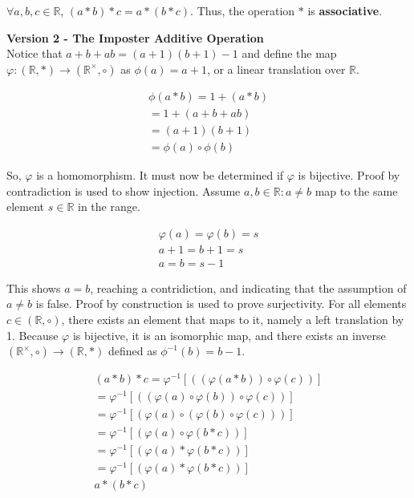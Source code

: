 \documentclass[12pt,letterpaper]{article}
\begin{document}
\begin{enumerate}
   $\forall a, b, c \in \mathbb{R}$, $(a * b) * c = a * (b * c)$.
   Thus, the operation $*$ is \textbf{associative}.

   \textbf{Version 2 - The Imposter Additive Operation} \\
   Notice that $a + b + ab = (a + 1)(b + 1) - 1$ and define the map $\varphi : (\mathbb{R}, *) \to (\mathbb{R}^\times, \circ)$ as 
   $\phi(a) = a + 1$, or a linear translation over $\mathbb{R}$.

   \begin{equation}
      \begin{aligned}
         \phi(a * b) = 1 + (a * b) \\
         = 1 + (a + b + ab) \\
         = (a + 1)(b+1) \\
         = \phi(a) \circ \phi(b)
      \end{aligned}
   \end{equation}

   So, $\varphi$ is a homomorphism.
   It must now be determined if $\varphi$ is bijective.
   Proof by contradiction is used to show injection.
   Assume $a, b \in \mathbb{R} : a \neq b$ map to the same element $s \in \mathbb{R}$ in the range.
   
   \begin{equation}
      \begin{aligned}
         \varphi(a) = \varphi(b) = s \\
         a + 1 = b + 1 = s \\
         a = b = s - 1
      \end{aligned}
   \end{equation}

   This shows $a = b$, reaching a contridiction, and indicating that the assumption of $a \neq b$ is false.
   Proof by construction is used to prove surjectivity.
   For all elements $c \in (\mathbb{R}, \circ)$, there exists an element that maps to it, namely a left translation by 1.
   Because $\varphi$ is bijective, it is an isomorphic map, and there exists an inverse
   $(\mathbb{R}^\times, \circ) \to (\mathbb{R}, *)$ defined as $\phi^{-1}(b) = b - 1$.

   \begin{equation}
      \begin{aligned}
         (a * b) * c = \varphi^{-1}\left[ ((\varphi(a * b)) \circ \varphi(c) ) \right] \\
         = \varphi^{-1}\left[ ((\varphi(a) \circ \varphi(b)) \circ \varphi(c) ) \right] \\
         = \varphi^{-1}\left[ (\varphi(a) \circ (\varphi(b) \circ \varphi(c)) ) \right] \\
         = \varphi^{-1}\left[ (\varphi(a) \circ \varphi(b * c) ) \right] \\
         = \varphi^{-1}\left[ (\varphi(a) * \varphi(b * c) ) \right] \\
         = \varphi^{-1}\left[ (\varphi(a) * \varphi(b * c) ) \right] \\
         a * (b * c)
      \end{aligned}
   \end{equation}


\end{enumerate}
\end{document}
